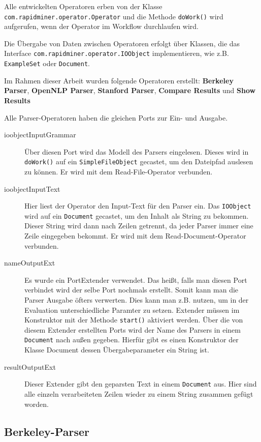 Alle entwickelten Operatoren erben von der Klasse \texttt{com.rapidminer.operator.Operator} und die Methode \texttt{doWork()} wird aufgerufen, wenn der Operator im Workflow durchlaufen wird. 

Die Übergabe von Daten zwischen Operatoren erfolgt über Klassen, die das Interface \texttt{com.rapidminer.operator.IOObject} implementieren, wie z.B. \texttt{ExampleSet} oder \texttt{Document}. 

Im Rahmen dieser Arbeit wurden folgende Operatoren erstellt: \textbf{Berkeley Parser}, \textbf{OpenNLP Parser}, \textbf{Stanford Parser}, \textbf{Compare Results} und \textbf{Show Results}

Alle Parser-Operatoren haben die gleichen Ports zur Ein- und Ausgabe. 
\begin{description}
\item[ioobjectInputGrammar]
Über diesen Port wird das Modell des Parsers eingelesen. Dieses wird in \texttt{doWork()} auf ein \texttt{SimpleFileObject} gecastet, um den Dateipfad auslesen zu können. Er wird mit dem Read-File-Operator verbunden.
\item[ioobjectInputText] Hier liest der Operator den Input-Text für den Parser ein. Das \texttt{IOObject} wird auf ein \texttt{Document} gecastet, um den Inhalt als String zu bekommen. Dieser String wird dann nach Zeilen getrennt, da jeder Parser immer eine Zeile eingegeben bekommt. Er wird mit dem Read-Document-Operator verbunden.
\item[nameOutputExt] Es wurde ein PortExtender verwendet. Das heißt, falls man diesen Port verbindet wird der selbe Port nochmals erstellt. Somit kann man die Parser Ausgabe öfters verwerten. Dies kann man z.B. nutzen, um in der Evaluation unterschiedliche Paramter zu setzen. Extender müssen im Konstruktor mit der Methode \texttt{start()} aktiviert werden. Über die von diesem Extender erstellten Ports wird der Name des Parsers in einem \texttt{Document} nach außen gegeben. Hierfür gibt es einen Konstruktor der Klasse Document dessen Übergabeparameter ein String ist. 
\item[resultOutputExt] Dieser Extender gibt den geparsten Text in einem \texttt{Document} aus. Hier sind alle einzeln verarbeiteten Zeilen wieder zu einem String zusammen gefügt worden.
\end{description}

\subsection{Berkeley-Parser}


